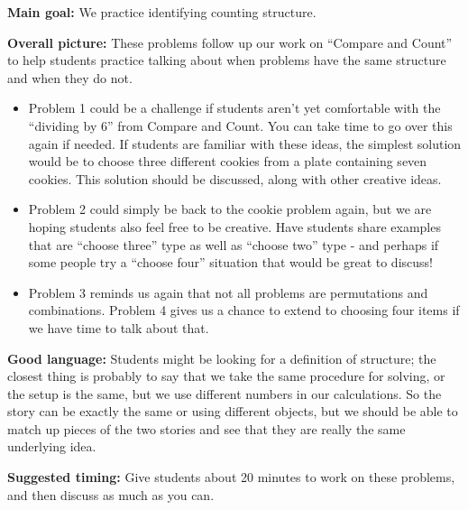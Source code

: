 \documentclass[nooutcomes,noauthor]{ximera}
\begin{document}
\newpage

\begin{instructorNotes}

{\bf Main goal:} We practice identifying counting structure.


{\bf Overall picture:} These problems follow up our work on ``Compare and Count'' to help students practice talking about when problems have the same structure and when they do not.

\begin{itemize}
	\item Problem 1 could be a challenge if students aren't yet comfortable with the ``dividing by 6'' from Compare and Count. You can take time to go over this again if needed. If students are familiar with these ideas, the simplest solution would be to choose three different cookies from a plate containing seven cookies. This solution should be discussed, along with other creative ideas.
	\item Problem 2 could simply be back to the cookie problem again, but we are hoping students also feel free to be creative. Have students share examples that are ``choose three'' type as well as ``choose two'' type - and perhaps if some people try a ``choose four'' situation that would be great to discuss!
	\item Problem 3 reminds us again that not all problems are permutations and combinations. Problem 4 gives us a chance to extend to choosing four items if we have time to talk about that.
	
\end{itemize}

{\bf Good language:} Students might be looking for a definition of structure; the closest thing is probably to say that we take the same procedure for solving, or the setup is the same, but we use different numbers in our calculations. So the story can be exactly the same or using different objects, but we should be able to match up pieces of the two stories and see that they are really the same underlying idea.


{\bf Suggested timing:} Give students about 20 minutes to work on these problems, and then discuss as much as you can.

\end{instructorNotes}
\end{document}
